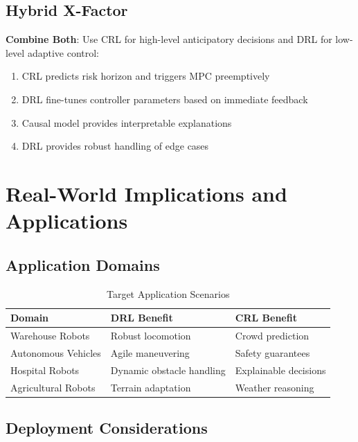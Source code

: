 \documentclass[11pt,a4paper]{article}
\begin{document}
\subsection{Hybrid X-Factor}

\begin{warningbox}
\textbf{Combine Both}: Use CRL for high-level anticipatory decisions and DRL for low-level adaptive control:

\begin{enumerate}
  \item CRL predicts risk horizon and triggers MPC preemptively
  \item DRL fine-tunes controller parameters based on immediate feedback
  \item Causal model provides interpretable explanations
  \item DRL provides robust handling of edge cases
\end{enumerate}
\end{warningbox}

\section{Real-World Implications and Applications}

\subsection{Application Domains}

\begin{table}[h]
\centering
\caption{Target Application Scenarios}
\begin{tabular}{lll}
\toprule
\textbf{Domain} & \textbf{DRL Benefit} & \textbf{CRL Benefit} \\
\midrule
Warehouse Robots & Robust locomotion & Crowd prediction \\
Autonomous Vehicles & Agile maneuvering & Safety guarantees \\
Hospital Robots & Dynamic obstacle handling & Explainable decisions \\
Agricultural Robots & Terrain adaptation & Weather reasoning \\
\bottomrule
\end{tabular}
\end{table}

\subsection{Deployment Considerations}
\end{document}
